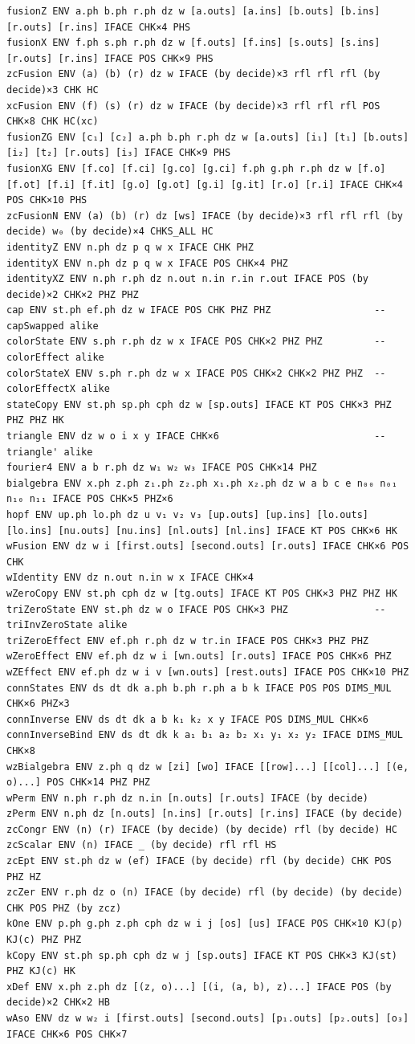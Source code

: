 {\begin{lstlisting}[style=leannet]
fusionZ ENV a.ph b.ph r.ph dz w [a.outs] [a.ins] [b.outs] [b.ins] [r.outs] [r.ins] IFACE CHK×4 PHS
fusionX ENV f.ph s.ph r.ph dz w [f.outs] [f.ins] [s.outs] [s.ins] [r.outs] [r.ins] IFACE POS CHK×9 PHS
zcFusion ENV (a) (b) (r) dz w IFACE (by decide)×3 rfl rfl rfl (by decide)×3 CHK HC
xcFusion ENV (f) (s) (r) dz w IFACE (by decide)×3 rfl rfl rfl POS CHK×8 CHK HC(xc)
fusionZG ENV [c₁] [c₂] a.ph b.ph r.ph dz w [a.outs] [i₁] [t₁] [b.outs] [i₂] [t₂] [r.outs] [i₃] IFACE CHK×9 PHS
fusionXG ENV [f.co] [f.ci] [g.co] [g.ci] f.ph g.ph r.ph dz w [f.o] [f.ot] [f.i] [f.it] [g.o] [g.ot] [g.i] [g.it] [r.o] [r.i] IFACE CHK×4 POS CHK×10 PHS
zcFusionN ENV (a) (b) (r) dz [ws] IFACE (by decide)×3 rfl rfl rfl (by decide) w₀ (by decide)×4 CHKS_ALL HC
identityZ ENV n.ph dz p q w x IFACE CHK PHZ
identityX ENV n.ph dz p q w x IFACE POS CHK×4 PHZ
identityXZ ENV n.ph r.ph dz n.out n.in r.in r.out IFACE POS (by decide)×2 CHK×2 PHZ PHZ
cap ENV st.ph ef.ph dz w IFACE POS CHK PHZ PHZ                  -- capSwapped alike
colorState ENV s.ph r.ph dz w x IFACE POS CHK×2 PHZ PHZ         -- colorEffect alike
colorStateX ENV s.ph r.ph dz w x IFACE POS CHK×2 CHK×2 PHZ PHZ  -- colorEffectX alike
stateCopy ENV st.ph sp.ph cph dz w [sp.outs] IFACE KT POS CHK×3 PHZ PHZ PHZ HK
triangle ENV dz w o i x y IFACE CHK×6                           -- triangle' alike
fourier4 ENV a b r.ph dz w₁ w₂ w₃ IFACE POS CHK×14 PHZ
bialgebra ENV x.ph z.ph z₁.ph z₂.ph x₁.ph x₂.ph dz w a b c e n₀₀ n₀₁ n₁₀ n₁₁ IFACE POS CHK×5 PHZ×6
hopf ENV up.ph lo.ph dz u v₁ v₂ v₃ [up.outs] [up.ins] [lo.outs] [lo.ins] [nu.outs] [nu.ins] [nl.outs] [nl.ins] IFACE KT POS CHK×6 HK
wFusion ENV dz w i [first.outs] [second.outs] [r.outs] IFACE CHK×6 POS CHK
wIdentity ENV dz n.out n.in w x IFACE CHK×4
wZeroCopy ENV st.ph cph dz w [tg.outs] IFACE KT POS CHK×3 PHZ PHZ HK
triZeroState ENV st.ph dz w o IFACE POS CHK×3 PHZ               -- triInvZeroState alike
triZeroEffect ENV ef.ph r.ph dz w tr.in IFACE POS CHK×3 PHZ PHZ
wZeroEffect ENV ef.ph dz w i [wn.outs] [r.outs] IFACE POS CHK×6 PHZ
wZEffect ENV ef.ph dz w i v [wn.outs] [rest.outs] IFACE POS CHK×10 PHZ
connStates ENV ds dt dk a.ph b.ph r.ph a b k IFACE POS POS DIMS_MUL CHK×6 PHZ×3
connInverse ENV ds dt dk a b k₁ k₂ x y IFACE POS DIMS_MUL CHK×6
connInverseBind ENV ds dt dk k a₁ b₁ a₂ b₂ x₁ y₁ x₂ y₂ IFACE DIMS_MUL CHK×8
wzBialgebra ENV z.ph q dz w [zi] [wo] IFACE [[row]...] [[col]...] [(e, o)...] POS CHK×14 PHZ PHZ
wPerm ENV n.ph r.ph dz n.in [n.outs] [r.outs] IFACE (by decide)
zPerm ENV n.ph dz [n.outs] [n.ins] [r.outs] [r.ins] IFACE (by decide)
zcCongr ENV (n) (r) IFACE (by decide) (by decide) rfl (by decide) HC
zcScalar ENV (n) IFACE _ (by decide) rfl rfl HS
zcEpt ENV st.ph dz w (ef) IFACE (by decide) rfl (by decide) CHK POS PHZ HZ
zcZer ENV r.ph dz o (n) IFACE (by decide) rfl (by decide) (by decide) CHK POS PHZ (by zcz)
kOne ENV p.ph g.ph z.ph cph dz w i j [os] [us] IFACE POS CHK×10 KJ(p) KJ(c) PHZ PHZ
kCopy ENV st.ph sp.ph cph dz w j [sp.outs] IFACE KT POS CHK×3 KJ(st) PHZ KJ(c) HK
xDef ENV x.ph z.ph dz [(z, o)...] [(i, (a, b), z)...] IFACE POS (by decide)×2 CHK×2 HB
wAso ENV dz w w₂ i [first.outs] [second.outs] [p₁.outs] [p₂.outs] [o₃] IFACE CHK×6 POS CHK×7
\end{lstlisting}

}
